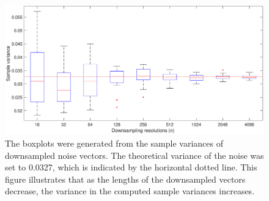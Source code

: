 \begin{figure}[htb]
\centerline{\includegraphics[scale=0.45]{Figures/VarPlot1D_F1_S05_W100_R20.eps}}
\caption{The boxplots were generated from the sample variances of downsampled noise vectors. The theoretical variance of the noise was set to 0.0327, which is indicated by the horizontal dotted line. This figure illustrates that as the lengths of the downsampled vectors decrease, the variance in the computed sample variances increases.}
\label{VarPlot1D}
\end{figure}

